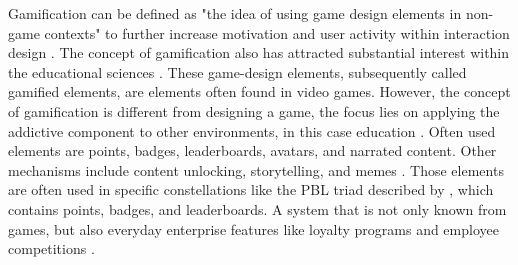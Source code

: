 Gamification can be defined as "the idea of using game design elements in non-game contexts" \parencite{deterdingGameDesignElements2011} to further increase motivation and user activity within interaction design \parencite{deterdingGameDesignElements2011}.
The concept of gamification also has attracted substantial interest within the educational sciences \parencite{swachaStateResearchGamification2021}.
These game-design elements, subsequently called gamified elements, are elements often found in video games.
However, the concept of gamification is different from designing a game, the focus lies on applying the addictive component to other environments, in this case education \parencite{gonzalezGamificationIntelligentTutoring2014}.
Often used elements are points, badges, leaderboards, avatars, and narrated content. Other mechanisms include content unlocking, storytelling, and memes \parencite{zainuddinImpactGamificationLearning2020}.
Those elements are often used in specific constellations like the PBL triad described by \textcite{werbachWinHowGame2012}, which contains points, badges, and leaderboards.
A system that is not only known from games, but also everyday enterprise features like loyalty programs and employee competitions \parencite{werbachWinHowGame2012}.


